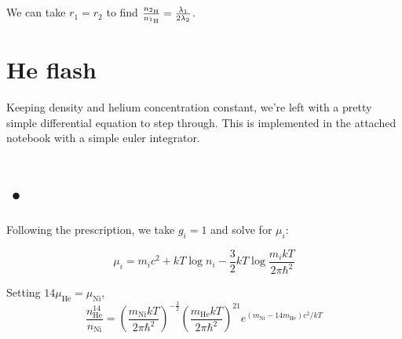 \documentclass[12pt]{article}
\newcommand{\pfrac}[2]{\left(\frac{#1}{#2} \right)}
\begin{document}
\subsection{}

We can take \(r_1 = r_2\) to find \(  \frac{n_{^{2}\mathrm{H}}}{n_{^{1}\mathrm{H}}} = \frac{\lambda_1}{2\lambda_2} \).

\section{He flash}

Keeping density and helium concentration constant, we're left with a pretty simple differential equation to step through. This is implemented in the attached notebook with a simple euler integrator.

\section{•}

Following the prescription, we take \(g_i = 1\) and solve for \(\mu_i\):

\[ \mu_i = m_i c^2 + kT \log{n_i} - \frac{3}{2}kT\log{\frac{m_i kT}{2\pi\hbar^2}}
\]


\newcommand{\muhe}{\mu_{\mathrm{He}}}
\newcommand{\muni}{\mu_{\mathrm{Ni}}}
\newcommand{\mhe}{m_{\mathrm{He}}}
\newcommand{\mni}{m_{\mathrm{Ni}}}
\newcommand{\nhe}{n_{\mathrm{He}}}
\newcommand{\nni}{n_{\mathrm{Ni}}}

Setting \(14\muhe = \muni\),
\[
\frac{\nhe^{14}}{\nni} = \pfrac{\mni kT}{2\pi\hbar^2}^{-\frac{3}{2}}\pfrac{\mhe kT}{2\pi\hbar^2}^{21} e^{(\mni-14\mhe)c^2/kT}
\]
\end{document}
